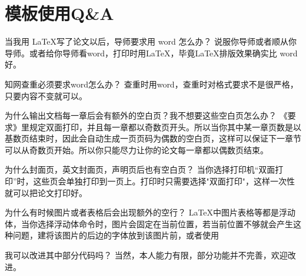 \linespread{1.55}\selectfont
\chapter{模板使用Q\&A}
\begin{mybox}{当我用 \LaTeX 写了论文以后，导师要求用 word 怎么办？}
说服你导师或者顺从你导师。或者给你导师看word，打印时用\LaTeX，毕竟\LaTeX 排版效果确实比 word 好。
\end{mybox}
\begin{mybox}{知网查重必须要求word怎么办？}
查重时用word，查重时对格式要求不是很严格，只要内容不变就可以。
\end{mybox}

\begin{mybox}{为什么输出文档每一章后会有额外的空白页？我不想要这些空白页怎么办？}
《要求》里规定双面打印，并且每一章都以奇数页开头。所以当你其中某一章页数是以基数页结束时，因此会自动生成一页页码为偶数的空白页，这样可以保证下一章节可以从奇数页开始。所以你只能尽力让你的论文每一章都以偶数页结束。
\end{mybox}

\begin{mybox}{为什么封面页，英文封面页，声明页后也有空白页？}
当你选择打印机“双面打印”时，这些页会单独打印到一页上。打印时只需要选择"双面打印"，这样一次性就可以把论文打印好。
\end{mybox}

\begin{mybox}{为什么有时候图片或者表格后会出现额外的空行？}
\LaTeX 中图片表格等都是浮动体，当你选择浮动体\myverb{[H]}命令时，图片会固定在当前位置，若当前位置不够就会产生这种问题，建将该图片的后边的字体放到该图片前，或者使用\myverb{[htp]}
\end{mybox}

\begin{mybox}{我可以改进其中部分代码吗？}
当然，本人能力有限，部分功能并不完善，欢迎改进。
\end{mybox}